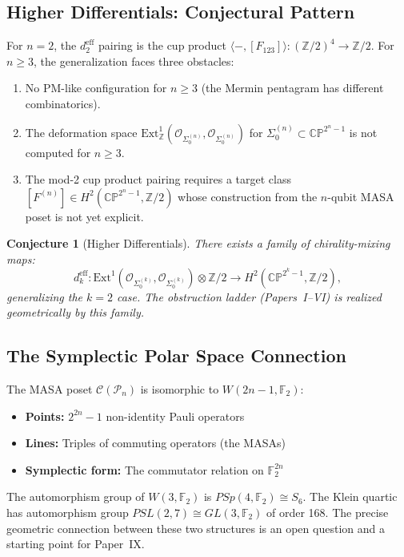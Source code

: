 \documentclass[11pt,a4paper]{article}
\newtheorem{conjecture}[theorem]{Conjecture}
\theoremstyle{remark}
\newcommand{\CP}{\mathbb{CP}}
\newcommand{\Z}{\mathbb{Z}}
\newcommand{\cO}{\mathcal{O}}
\newcommand{\cC}{\mathcal{C}}
\newcommand{\PP}{\mathcal{P}}
\begin{document}
\subsection{Higher Differentials: Conjectural Pattern}

For $n=2$, the $d_2^{\text{eff}}$ pairing is the cup product
$\langle -, [F_{123}] \rangle: (\Z/2)^4 \to \Z/2$. For $n \geq 3$, the
generalization faces three obstacles:
\begin{enumerate}
  \item No PM-like configuration for $n \geq 3$ (the Mermin pentagram
    has different combinatorics).
  \item The deformation space
    $\text{Ext}^1_{\Z}(\cO_{\Sigma_0^{(n)}}, \cO_{\Sigma_0^{(n)}})$ for
    $\Sigma_0^{(n)} \subset \CP^{2^n-1}$ is not computed for $n \geq 3$.
  \item The mod-2 cup product pairing requires a target class
    $[F^{(n)}] \in H^2(\CP^{2^n-1}, \Z/2)$ whose construction from the
    $n$-qubit MASA poset is not yet explicit.
\end{enumerate}

\begin{conjecture}[Higher Differentials]
\label{conj:higher}
There exists a family of chirality-mixing maps:
\[
d_k^{\text{eff}}: \text{Ext}^1(\cO_{\Sigma_0^{(k)}}, \cO_{\Sigma_0^{(k)}})
  \otimes \Z/2 \longrightarrow H^2(\CP^{2^k-1}, \Z/2),
\]
generalizing the $k=2$ case. The obstruction ladder (Papers~I--VI) is
realized geometrically by this family.
\end{conjecture}

\subsection{The Symplectic Polar Space Connection}

The MASA poset $\cC(\PP_n)$ is isomorphic to $W(2n-1, \mathbb{F}_2)$:
\begin{itemize}
  \item \textbf{Points:} $2^{2n} - 1$ non-identity Pauli operators
  \item \textbf{Lines:} Triples of commuting operators (the MASAs)
  \item \textbf{Symplectic form:} The commutator relation on $\mathbb{F}_2^{2n}$
\end{itemize}

The automorphism group of $W(3, \mathbb{F}_2)$ is
$PSp(4, \mathbb{F}_2) \cong S_6$. The Klein quartic has automorphism
group $PSL(2, 7) \cong GL(3, \mathbb{F}_2)$ of order 168. The precise
geometric connection between these two structures is an open question
and a starting point for Paper~IX.
\end{document}
